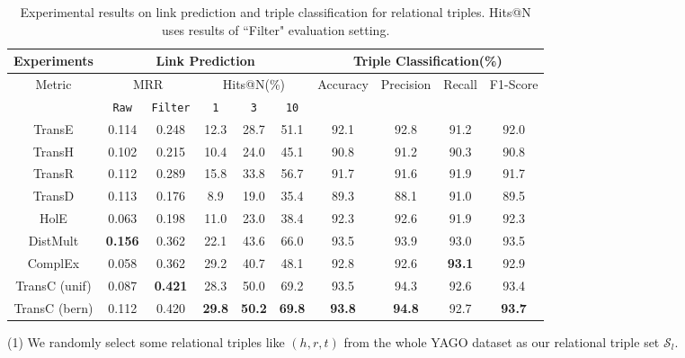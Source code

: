 \documentclass[11pt,a4paper]{article}
\begin{document}
    \begin{table*}[!htb]
      \small
      \centering
      \setlength{\belowcaptionskip}{-1pt}
          \begin{tabular}{c|cc|ccc|cccc}
          \hline
          Experiments & \multicolumn{5}{c|}{Link Prediction} & \multicolumn{4}{c}{Triple Classification(\%)} \\
          \hline
          \multirow{2}{*}{Metric} & \multicolumn{2}{c|}{MRR} & \multicolumn{3}{c|}{Hits@N(\%)} 
          & \multirow{2}{*}{Accuracy} & \multirow{2}{*}{Precision} & \multirow{2}{*}{Recall} & \multirow{2}{*}{F1-Score} \\
          & \texttt{Raw} & \texttt{Filter} & \texttt{1} & \texttt{3} & \texttt{10} &  &  &  &   \\
          \hline
          TransE  & 0.114  & 0.248  & 12.3   & 28.7  & 51.1 & 92.1  & 92.8  & 91.2   & 92.0 \\
          TransH   & 0.102  & 0.215   & 10.4   & 24.0  & 45.1 & 90.8  & 91.2   & 90.3   & 90.8  \\
          TransR   & 0.112  & 0.289   & 15.8   & 33.8 & 56.7 & 91.7  & 91.6   & 91.9   & 91.7  \\
          TransD   & 0.113  & 0.176   & 8.9   & 19.0 & 35.4 & 89.3  & 88.1   & 91.0   & 89.5  \\
          HolE & 0.063  & 0.198   & 11.0   & 23.0 & 38.4 & 92.3  & 92.6   & 91.9   & 92.3  \\
          DistMult & \textbf{0.156}  & 0.362   & 22.1   & 43.6 & 66.0 & 93.5  & 93.9   & 93.0   & 93.5  \\
          ComplEx & 0.058  & 0.362   & 29.2   & 40.7 & 48.1 & 92.8  & 92.6   & \textbf{93.1}   & 92.9  \\
          \hline
          TransC (unif)  & 0.087  & \textbf{0.421}   & 28.3   & 50.0 & 69.2 & 93.5  & 94.3   & 92.6   & 93.4  \\
          TransC (bern)  & 0.112  & 0.420   & \textbf{29.8}   & \textbf{50.2} &  \textbf{69.8} & \textbf{93.8}  & \textbf{94.8}   & 92.7   & \textbf{93.7}   \\
          \hline
          \end{tabular}
          \caption{\label{table2}Experimental results on link prediction and triple classification for relational triples. 
      Hits@N uses results of ``Filter" evaluation setting.}
      \end{table*}
  
  (1) We randomly select some relational triples like $(h, r, t)$ from the whole YAGO dataset as our relational triple set $\mathcal{S}_l$.
  
\end{document}
